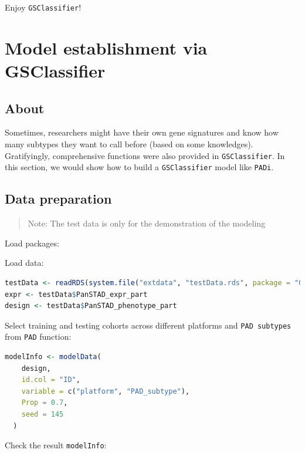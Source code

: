 \documentclass[
  12pt,
]{book}
\newcommand{\passthrough}[1]{#1}
\begin{document}
Enjoy \passthrough{\lstinline!GSClassifier!}!

\hypertarget{model-establishment-via-gsclassifier}{%
\chapter{Model establishment via GSClassifier}\label{model-establishment-via-gsclassifier}}

\hypertarget{about-2}{%
\section{About}\label{about-2}}

Sometimes, researchers might have their own gene signatures and know how many subtypes they want to call before (based on some knowledges). Gratifyingly, comprehensive functions were also provided in \passthrough{\lstinline!GSClassifier!}. In this section, we would show how to build a \passthrough{\lstinline!GSClassifier!} model like \passthrough{\lstinline!PADi!}.

\hypertarget{data-preparation}{%
\section{Data preparation}\label{data-preparation}}

\begin{quote}
Note: The test data is only for the demonstration of the modeling
\end{quote}

Load packages:

Load data:

\begin{lstlisting}[language=R]
testData <- readRDS(system.file("extdata", "testData.rds", package = "GSClassifier"))
expr <- testData$PanSTAD_expr_part
design <- testData$PanSTAD_phenotype_part
\end{lstlisting}

Select training and testing cohorts across different platforms and \passthrough{\lstinline!PAD subtypes!} from \passthrough{\lstinline!PAD!} function:

\begin{lstlisting}[language=R]
modelInfo <- modelData(
    design,
    id.col = "ID",
    variable = c("platform", "PAD_subtype"),
    Prop = 0.7,
    seed = 145
  )
\end{lstlisting}

Check the result \passthrough{\lstinline!modelInfo!}:
\end{document}
